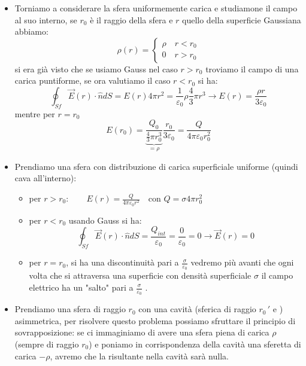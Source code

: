 \documentclass{book}
\begin{document}
\begin{itemize}
     per cui si trova che il campo all'interno avrà un unica componente (ovvero lungo le x):
     $$
     \vec{E}= \frac{\rho x}{\varepsilon_0} \qquad { \text{con } |x|<d}
     $$
     se valutiamo il campo all'esterno del muro avremo invece che la distribuzione volumetrica si comporta come una superficie ideale, poiché lo spessore $d$ non influisce più sulla geometria del campo ($\rho d = \sigma$):
     $$
     E(x)= \frac{\rho d}{\varepsilon_0} \qquad { \text{con } |x|>d}
     $$
     \item Torniamo a considerare la sfera uniformemente carica e studiamone il campo al suo interno, se $r_0$ è il raggio della sfera e $r$ quello della superficie Gaussiana abbiamo:
$$
\rho(r) = 
\begin{cases}
     \rho \quad r<r_0 \\
     0 \quad r>r_0
\end{cases}
$$
si era già visto che se usiamo Gauss nel caso $r>r_0$ troviamo il campo di una carica puntiforme, se ora valutiamo il caso $r<r_0$ si ha:
 $$
 \oint_{Sf} \vec{E}(r)\cdot \hat{n}dS = E(r) 4 \pi r^2 = \frac{1}{\varepsilon_0} \rho \frac{4}{3} \pi r^3 \to E(r) = \frac{\rho r}{3 \varepsilon_0} 
 $$
mentre per $r=r_0$ 
$$
E(r_0)= \underbrace{\frac{Q_0}{\frac{4}{3}\pi r_0^3}}_{=\rho} \frac{r_0}{3 \varepsilon_0} = \frac{Q}{4 \pi \varepsilon_0 r_0^2}
$$
\item Prendiamo una sfera con distribuzione di carica superficiale uniforme (quindi cava all'interno):
\begin{itemize}
    \item per $r>r_0: \qquad E(r)= \frac{Q}{4\pi\varepsilon_0 r^2} \quad \text{con } Q = \sigma 4 \pi r_0^2$ 
    \item per $r<r_0$ usando Gauss si ha:
    $$
    \oint_{Sf} \vec{E}(r) \cdot \hat{n} dS = \frac{Q_{int}}{\varepsilon_0} = \frac{0}{\varepsilon_0} = 0   \to \vec{E}(r)=0$$
    \item per $r=r_0$, si ha una discontinuità pari a $\frac{\sigma}{\varepsilon_0}$ vedremo più avanti che ogni volta che si attraversa una superficie con densità superficiale $\sigma$ il campo elettrico ha un "salto" pari a $\frac{\sigma}{\varepsilon_0}$ .
\end{itemize}

\item Prendiamo una sfera di raggio $r_0$ con una cavità (sferica di raggio $r_0\,'$ e ) asimmetrica, per risolvere questo problema possiamo sfruttare il principio di sovrapposizione: se ci immaginiamo di avere una sfera piena di carica $\rho$ (sempre di raggio $r_0$) e poniamo in corrispondenza della cavità una sferetta di carica $-\rho$, avremo che la risultante nella cavità sarà nulla.
 

\end{itemize}
\end{document}
